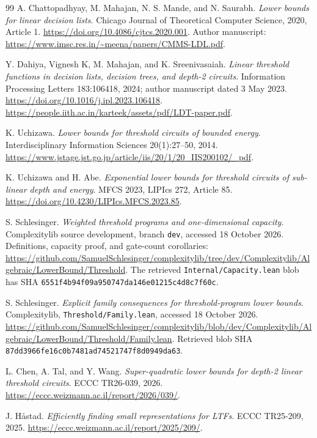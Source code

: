 \documentclass[11pt]{article}
\theoremstyle{definition}
\begin{document}
\begin{thebibliography}{99}
A. Chattopadhyay, M. Mahajan, N. S. Mande, and N. Saurabh.
\emph{Lower bounds for linear decision lists}.
Chicago Journal of Theoretical Computer Science, 2020, Article 1.
\url{https://doi.org/10.4086/cjtcs.2020.001}.
Author manuscript:
\url{https://www.imsc.res.in/~meena/papers/CMMS-LDL.pdf}.

Y. Dahiya, Vignesh K, M. Mahajan, and K. Sreenivasaiah.
\emph{Linear threshold functions in decision lists, decision trees, and depth-2 circuits}.
Information Processing Letters 183:106418, 2024; author manuscript dated 3 May 2023.
\url{https://doi.org/10.1016/j.ipl.2023.106418}.
\url{https://people.iith.ac.in/karteek/assets/pdf/LDT-paper.pdf}.

K. Uchizawa.
\emph{Lower bounds for threshold circuits of bounded energy}.
Interdisciplinary Information Sciences 20(1):27--50, 2014.
\url{https://www.jstage.jst.go.jp/article/iis/20/1/20_IIS200102/_pdf}.

K. Uchizawa and H. Abe.
\emph{Exponential lower bounds for threshold circuits of sub-linear depth and energy}.
MFCS 2023, LIPIcs 272, Article 85.
\url{https://doi.org/10.4230/LIPIcs.MFCS.2023.85}.

S. Schlesinger.
\emph{Weighted threshold programs and one-dimensional capacity}.
Complexitylib source development, branch \texttt{dev}, accessed 18 October 2026.
Definitions, capacity proof, and gate-count corollaries:
\url{https://github.com/SamuelSchlesinger/complexitylib/tree/dev/Complexitylib/Algebraic/LowerBound/Threshold}.
The retrieved \texttt{Internal/Capacity.lean} blob has SHA
\texttt{6551f4b94f09a950747da146e01215c4d8c7f60c}.

S. Schlesinger.
\emph{Explicit family consequences for threshold-program lower bounds}.
Complexitylib, \texttt{Threshold/Family.lean}, accessed 18 October 2026.
\url{https://github.com/SamuelSchlesinger/complexitylib/blob/dev/Complexitylib/Algebraic/LowerBound/Threshold/Family.lean}.
Retrieved blob SHA \texttt{87dd3966fe16c0b7481ad74521747f8d0949da63}.

L. Chen, A. Tal, and Y. Wang.
\emph{Super-quadratic lower bounds for depth-2 linear threshold circuits}.
ECCC TR26-039, 2026.
\url{https://eccc.weizmann.ac.il/report/2026/039/}.

J. H{\aa}stad.
\emph{Efficiently finding small representations for LTFs}.
ECCC TR25-209, 2025.
\url{https://eccc.weizmann.ac.il/report/2025/209/}.


\end{thebibliography}
\end{document}

